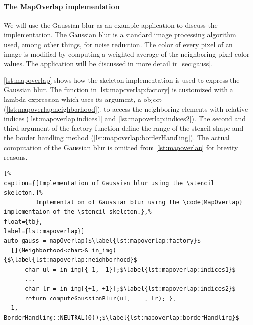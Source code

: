 \paragraph{The MapOverlap implementation}

We will use the Gaussian blur as an example application to discuss the  implementation.
The Gaussian blur is a standard image processing algorithm used, among other things, for noise reduction.
The color of every pixel of an image is modified by computing a weighted average of the neighboring pixel color values.
The application will be discussed in more detail in \autoref{sec:gauss}.

\autoref{lst:mapoverlap} shows how the  skeleton implementation is used to express the Gaussian blur.
The  function in \autoref{lst:mapoverlap:factory} is customized with a lambda expression which uses its argument, a  object (\autoref{lst:mapoverlap:neighborhood}), to access the neighboring elements with relative indices (\autoref{lst:mapoverlap:indices1} and \autoref{lst:mapoverlap:indices2}).
The second and third argument of the factory function define the range of the stencil shape and the border handling method (\autoref{lst:mapoverlap:borderHandling}).
The actual computation of the Gaussian blur is omitted from \autoref{lst:mapoverlap} for brevity reasons.

\begin{lstlisting}[%
caption={[Implementation of Gaussian blur using the \stencil skeleton.]%
         Implementation of Gaussian blur using the \code{MapOverlap} implementaion of the \stencil skeleton.},%
float={tb},
label={lst:mapoverlap}]
auto gauss = mapOverlap($\label{lst:mapoverlap:factory}$
  [](Neighborhood<char>& in_img) {$\label{lst:mapoverlap:neighborhood}$
      char ul = in_img[{-1, -1}];$\label{lst:mapoverlap:indices1}$
      ...
      char lr = in_img[{+1, +1}];$\label{lst:mapoverlap:indices2}$
      return computeGaussianBlur(ul, ..., lr); },
  1, BorderHandling::NEUTRAL(0));$\label{lst:mapoverlap:borderHandling}$
\end{lstlisting}


